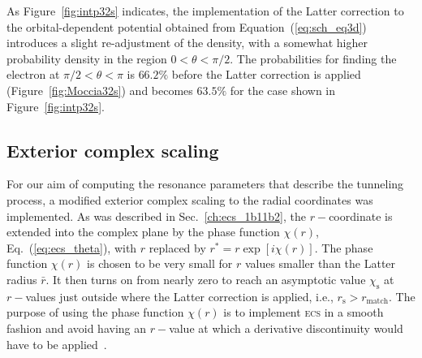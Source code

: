 As Figure~\ref{fig:intp32s} indicates, the implementation of the
Latter correction to the orbital-dependent potential obtained from
Equation~(\ref{eq:sch_eq3d}) introduces a slight re-adjustment of the
density, with a somewhat higher probability density in the region $0 <
\theta < \pi/2$. The probabilities for finding the electron at $\pi/2
< \theta < \pi$ is $66.2\%$ before the Latter correction is applied
(Figure~\ref{fig:Moccia32s}) and becomes $63.5\%$ for the case shown
in Figure~\ref{fig:intp32s}.

\subsection{Exterior complex scaling}
\label{ch:3a1_ecs}

For our aim of computing the resonance parameters that describe the
tunneling process, a modified exterior complex scaling to the radial
coordinates was implemented. As was described in
Sec.~\ref{ch:ecs_1b11b2}, the $r-$coordinate is extended into the
complex plane by the phase function $\chi(r)$,
Eq.~(\ref{eq:ecs_theta}), with $r$ replaced by $r^{*} =
r\exp[i\chi(r)]$. The phase function $\chi(r)$ is chosen to be very
small for $r$ values smaller than the Latter radius $\bar{r}$. It then
turns on from nearly zero to reach an asymptotic value
$\chi_{\mathrm{s}}$ at $r-$values just outside where the Latter
correction is applied, i.e., $r_{\mathrm{s}} >
r_{\mathrm{match}}$. The purpose of using the phase function $\chi(r)$
is to implement \textsc{ecs} in a smooth fashion and avoid having an
$r-$value at which a derivative discontinuity would have to be
applied~\cite{ecsScrinzi}.

